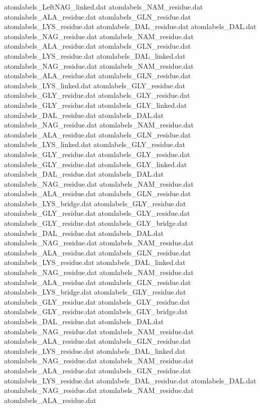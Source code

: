 atomlabels_LeftNAG_linked.dat   
atomlabels_NAM_residue.dat      
atomlabels_ALA_residue.dat      
atomlabels_GLN_residue.dat      
atomlabels_LYS_residue.dat      
atomlabels_DAL_residue.dat      
atomlabels_DAL.dat              
atomlabels_NAG_residue.dat      
atomlabels_NAM_residue.dat      
atomlabels_ALA_residue.dat      
atomlabels_GLN_residue.dat      
atomlabels_LYS_residue.dat      
atomlabels_DAL_linked.dat       
atomlabels_NAG_residue.dat      
atomlabels_NAM_residue.dat      
atomlabels_ALA_residue.dat      
atomlabels_GLN_residue.dat      
atomlabels_LYS_linked.dat       
atomlabels_GLY_residue.dat
atomlabels_GLY_residue.dat
atomlabels_GLY_residue.dat
atomlabels_GLY_residue.dat
atomlabels_GLY_linked.dat
atomlabels_DAL_residue.dat      
atomlabels_DAL.dat              
atomlabels_NAG_residue.dat      
atomlabels_NAM_residue.dat      
atomlabels_ALA_residue.dat      
atomlabels_GLN_residue.dat      
atomlabels_LYS_linked.dat       
atomlabels_GLY_residue.dat
atomlabels_GLY_residue.dat
atomlabels_GLY_residue.dat
atomlabels_GLY_residue.dat
atomlabels_GLY_linked.dat
atomlabels_DAL_residue.dat      
atomlabels_DAL.dat              
atomlabels_NAG_residue.dat      
atomlabels_NAM_residue.dat      
atomlabels_ALA_residue.dat      
atomlabels_GLN_residue.dat      
atomlabels_LYS_bridge.dat       
atomlabels_GLY_residue.dat
atomlabels_GLY_residue.dat
atomlabels_GLY_residue.dat
atomlabels_GLY_residue.dat
atomlabels_GLY_bridge.dat
atomlabels_DAL_residue.dat      
atomlabels_DAL.dat              
atomlabels_NAG_residue.dat      
atomlabels_NAM_residue.dat      
atomlabels_ALA_residue.dat      
atomlabels_GLN_residue.dat      
atomlabels_LYS_residue.dat      
atomlabels_DAL_linked.dat       
atomlabels_NAG_residue.dat      
atomlabels_NAM_residue.dat      
atomlabels_ALA_residue.dat      
atomlabels_GLN_residue.dat      
atomlabels_LYS_bridge.dat       
atomlabels_GLY_residue.dat
atomlabels_GLY_residue.dat
atomlabels_GLY_residue.dat
atomlabels_GLY_residue.dat
atomlabels_GLY_bridge.dat
atomlabels_DAL_residue.dat      
atomlabels_DAL.dat              
atomlabels_NAG_residue.dat      
atomlabels_NAM_residue.dat      
atomlabels_ALA_residue.dat      
atomlabels_GLN_residue.dat      
atomlabels_LYS_residue.dat      
atomlabels_DAL_linked.dat       
atomlabels_NAG_residue.dat      
atomlabels_NAM_residue.dat      
atomlabels_ALA_residue.dat      
atomlabels_GLN_residue.dat      
atomlabels_LYS_residue.dat      
atomlabels_DAL_residue.dat      
atomlabels_DAL.dat              
atomlabels_NAG_residue.dat      
atomlabels_NAM_residue.dat      
atomlabels_ALA_residue.dat      
